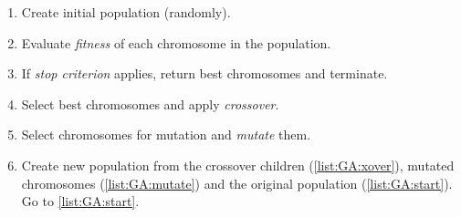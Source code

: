 \documentclass[../header]{subfiles}
\begin{document}
\begin{enumerate}[start=0]
  \item Create initial population (randomly).
  \item\label{list:GA:start} Evaluate \emph{fitness} of each chromosome in the population.
  \item If \emph{stop criterion} applies, return best chromosomes and terminate.
  \item\label{list:GA:xover} Select best chromosomes and apply \emph{crossover}.
  \item\label{list:GA:mutate} Select chromosomes for mutation and \emph{mutate} them.
  \item Create new population from the crossover children (\ref{list:GA:xover}),
        mutated chromosomes (\ref{list:GA:mutate}) and the original population
        (\ref{list:GA:start}).
        Go to \ref{list:GA:start}.
\end{enumerate}
\end{document}
